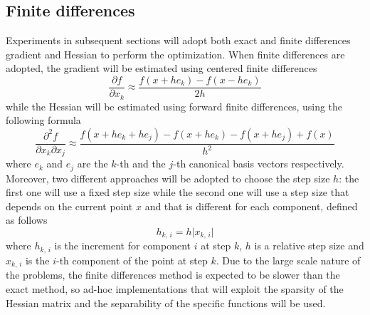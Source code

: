 \subsection{Finite differences}

Experiments in subsequent sections will adopt both exact and finite differences gradient and Hessian to perform the optimization.
When finite differences are adopted, the gradient will be estimated using centered finite differences
\begin{equation}
    \label{eq:findiff_gradient}
    \frac{\partial f}{\partial x_k} \approx \frac{f(x + he_k) - f(x - he_k)}{2h}
\end{equation}
while the Hessian will be estimated using forward finite differences, using the following formula
\begin{equation}
    \label{eq:findiff_hessian}
    \frac{\partial^2 f}{\partial x_k \partial x_j} \approx \frac{f(x + he_k + he_j) - f(x + he_k) - f(x + he_j) + f(x)}{h^2}
\end{equation}
where $e_k$ and $e_j$ are the $k$-th and the $j$-th canonical basis vectors respectively.
Moreover, two different approaches will be adopted to choose the step size $h$: the first one will use a fixed step size while the second one will use a step size that depends on the current point $x$ and that is different for each component, defined as follows
\[
h_{k,\,i} = h \lvert x_{k,\,i} \rvert
\]
where $h_{k,\,i}$ is the increment for component $i$ at step $k$, $h$ is a relative step size and $x_{k,\,i}$ is the $i$-th component of the point at step $k$.
Due to the large scale nature of the problems, the finite differences method is expected to be slower than the exact method, so ad-hoc implementations that will exploit the sparsity of the Hessian matrix and the separability of the specific functions will be used.